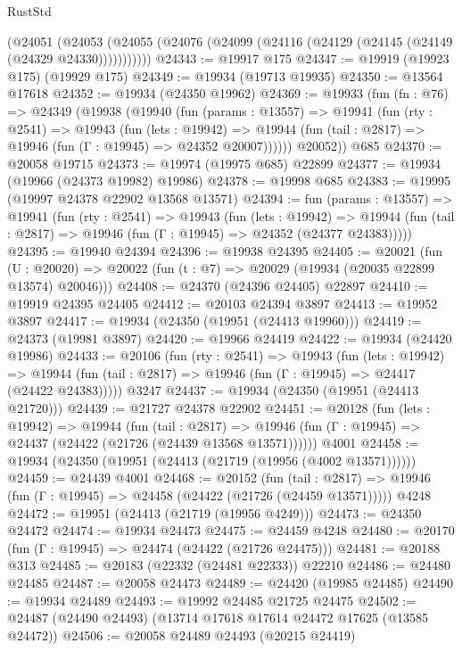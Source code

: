 \begin{lexlean}{RustStd}
\begin{coremodule}
      (@24051
        (@24053 (@24055 (@24076 (@24099 (@24116 (@24129 (@24145 (@24149 (@24329 @24330)))))))))))
@24343 := @19917 @175
@24347 := @19919 (@19923 @175) (@19929 @175)
@24349 := @19934 (@19713 @19935)
@24350 := @13564 @17618
@24352 := @19934 (@24350 @19962)
@24369 := @19933
    (fun (fn : @76) =>
    @24349
      (@19938
        (@19940
          (fun (params : @13557) =>
          @19941
            (fun (rty : @2541) =>
            @19943
              (fun (lets : @19942) =>
              @19944 (fun (tail : @2817) => @19946 (fun (Γ : @19945) => @24352 @20007))))))
        @20052))
    @685
@24370 := @20058 @19715
@24373 := @19974 (@19975 @685) @22899
@24377 := @19934 (@19966 (@24373 @19982) @19986)
@24378 := @19998 @685
@24383 := @19995 (@19997 @24378 @22902 @13568 @13571)
@24394 := fun (params : @13557) =>
  @19941
    (fun (rty : @2541) =>
    @19943
      (fun (lets : @19942) =>
      @19944 (fun (tail : @2817) => @19946 (fun (Γ : @19945) => @24352 (@24377 @24383)))))
@24395 := @19940 @24394
@24396 := @19938 @24395
@24405 := @20021
    (fun (U : @20020) => @20022 (fun (t : @7) => @20029 (@19934 (@20035 @22899 @13574) @20046)))
@24408 := @24370 (@24396 @24405) @22897
@24410 := @19919 @24395 @24405
@24412 := @20103 @24394 @3897
@24413 := @19952 @3897
@24417 := @19934 (@24350 (@19951 (@24413 @19960)))
@24419 := @24373 (@19981 @3897)
@24420 := @19966 @24419
@24422 := @19934 (@24420 @19986)
@24433 := @20106
    (fun (rty : @2541) =>
    @19943
      (fun (lets : @19942) =>
      @19944 (fun (tail : @2817) => @19946 (fun (Γ : @19945) => @24417 (@24422 @24383)))))
    @3247
@24437 := @19934 (@24350 (@19951 (@24413 @21720)))
@24439 := @21727 @24378 @22902
@24451 := @20128
    (fun (lets : @19942) =>
    @19944
      (fun (tail : @2817) =>
      @19946 (fun (Γ : @19945) => @24437 (@24422 (@21726 (@24439 @13568 @13571))))))
    @4001
@24458 := @19934 (@24350 (@19951 (@24413 (@21719 (@19956 (@4002 @13571))))))
@24459 := @24439 @4001
@24468 := @20152
    (fun (tail : @2817) => @19946 (fun (Γ : @19945) => @24458 (@24422 (@21726 (@24459 @13571)))))
    @4248
@24472 := @19951 (@24413 (@21719 (@19956 @4249)))
@24473 := @24350 @24472
@24474 := @19934 @24473
@24475 := @24459 @4248
@24480 := @20170 (fun (Γ : @19945) => @24474 (@24422 (@21726 @24475)))
@24481 := @20188 @313
@24485 := @20183 (@22332 (@24481 @22333)) @22210
@24486 := @24480 @24485
@24487 := @20058 @24473
@24489 := @24420 (@19985 @24485)
@24490 := @19934 @24489
@24493 := @19992 @24485 @21725 @24475
@24502 := @24487 (@24490 @24493) (@13714 @17618 @17614 @24472 @17625 (@13585 @24472))
@24506 := @20058 @24489 @24493 (@20215 @24419)

\end{coremodule}
\end{lexlean}
